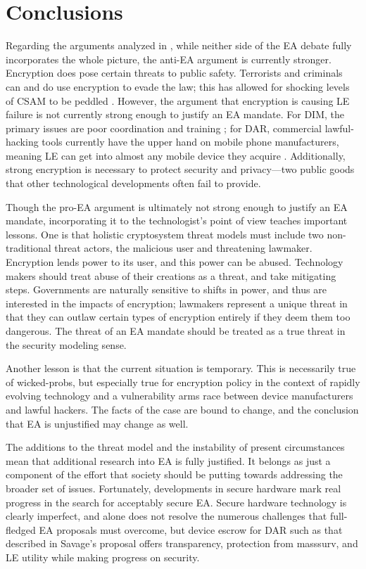 \section{Conclusions}

Regarding the arguments analyzed in , while neither side of the \ac{EA} debate fully incorporates
the whole picture, the anti-\ac{EA} argument is currently stronger. Encryption does pose certain threats to public
safety. Terrorists and criminals can and do use encryption to evade the law; this has allowed for shocking levels of
\acf{CSAM} to be peddled \cite{keller_internet_2019}. However, the argument that \ac{encryption} is causing \acl{LE}
failure is not currently strong enough to justify an \ac{EA} mandate. For \ac{DIM}, the primary issues are poor
coordination and training \cite{carter_2018}; for \ac{DAR}, commercial \ac{lawful-hacking} tools currently have the
upper hand on mobile phone manufacturers, meaning \acl{LE} can get into almost any mobile device they acquire
\cite{koepke_2020}. Additionally, strong \ac{encryption} is necessary to protect security and privacy---two public goods
that other technological developments often fail to provide.

Though the pro-\ac{EA} argument is ultimately not strong enough to justify an \ac{EA} mandate, incorporating it to the
technologist's point of view teaches important lessons. One is that holistic cryptosystem threat models must include two
non-traditional threat actors, the malicious user and threatening lawmaker. Encryption lends power to its user, and this
power can be abused. Technology makers should treat abuse of their creations as a threat, and take mitigating steps.
Governments are naturally sensitive to shifts in power, and thus are interested in the impacts of encryption; lawmakers
represent a unique threat in that they can outlaw certain types of encryption entirely if they deem them too dangerous.
The threat of an \ac{EA} mandate should be treated as a true threat in the security modeling sense.

Another lesson is that the current situation is temporary. This is necessarily true of \acp{wicked-prob}, but especially
true for encryption policy in the context of rapidly evolving technology and a vulnerability arms race between device
manufacturers and lawful hackers. The facts of the case are bound to change, and the conclusion that \ac{EA} is
unjustified may change as well.

The additions to the threat model and the instability of present circumstances mean that additional research into
\ac{EA} is fully justified. It belongs as just a component of the effort that society should be putting towards
addressing the broader set of issues. Fortunately, developments in secure hardware mark real progress in the search for
acceptably secure \ac{EA}. Secure hardware technology is clearly imperfect, and alone does not resolve the numerous
challenges that full-fledged \ac{EA} proposals must overcome, but device escrow for \acl{DAR} such as that described in
Savage's proposal offers transparency, protection from \ac{masssurv}, and \acl{LE} utility while making progress on
security.

